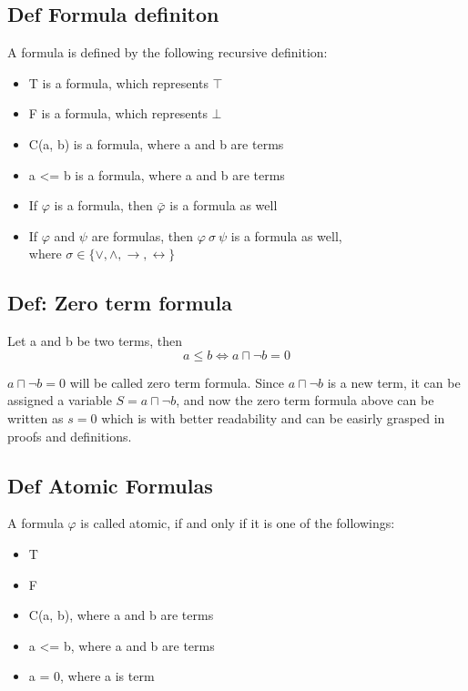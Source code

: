 \documentclass{article}
\begin{document}
	\subsection*{Def Formula definiton}
		A formula is defined by the following recursive definition:
		\begin{itemize}
			\item T is a formula, which represents $\top$
			\item F is a formula, which represents $\bot$
			\item C(a, b) is a formula, where a and b are terms
			\item a <= b is a formula, where a and b are terms
			\item If $\varphi$ is a formula, then $\bar{\varphi}$ is a formula as well
			\item If $\varphi$ and $\psi$ are formulas, then $\varphi \: \sigma \: \psi $ is a formula as well,\\
				where $\sigma \in \{\vee, \wedge, \rightarrow, \leftrightarrow\}$
		\end{itemize}
	
	\subsection*{Def: Zero term formula}
		Let a and b be two terms, then
		\begin{equation}
			a \le b \iff a \sqcap \neg b = 0
		\end{equation}

		$a \sqcap \neg b = 0$ will be called zero term formula.
		Since $a \sqcap \neg b$ is a new term, it can be assigned a variable $S = a \sqcap \neg b$, 
		and now the zero term formula above can be written as $s  = 0$ which is with better readability and 
		can be easirly grasped in proofs and definitions.


	\subsection*{Def Atomic Formulas}
		A formula $\varphi$ is called atomic, if and only if it is one of the followings:
		\begin{itemize}
			\item T
			\item F
			\item C(a, b), where a and b are terms
			\item a <= b, where a and b are terms
			\item a = 0, where a is term
		\end{itemize}
		
\end{document}
